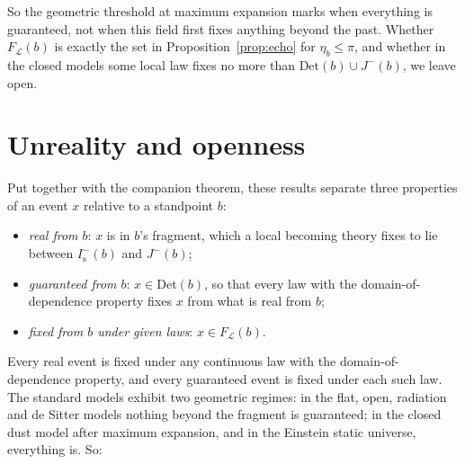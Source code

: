 \documentclass[11pt]{article}
\theoremstyle{definition}
\newcommand{\Is}{I^-_{\mathrm s}}
\newcommand{\Det}{\mathrm{Det}}
\begin{document}
So the geometric threshold at maximum expansion marks when everything is
guaranteed, not when this field first fixes anything beyond the past.
Whether $F_{\mathcal L}(b)$ is exactly the set in Proposition~\ref{prop:echo}
for $\eta_b\le\pi$, and whether in the closed models some local law fixes no
more than $\Det(b)\cup J^-(b)$, we leave open.

\section{Unreality and openness}\label{sec:phil}

Put together with the companion theorem, these results separate three
properties of an event $x$ relative to a standpoint $b$:
\begin{itemize}
\item \emph{real from $b$}: $x$ is in $b$'s fragment, which a local becoming
theory fixes to lie between $\Is(b)$ and $J^-(b)$;
\item \emph{guaranteed from $b$}: $x\in\Det(b)$, so that every law with the
domain-of-dependence property fixes $x$ from what is real from $b$;
\item \emph{fixed from $b$ under given laws}: $x\in F_{\mathcal L}(b)$.
\end{itemize}
Every real event is fixed under any continuous law with the
domain-of-dependence property, and every guaranteed event is fixed under
each such law. The standard models exhibit two geometric regimes: in the
flat, open, radiation and de Sitter models nothing beyond the fragment is
guaranteed; in the closed dust model after maximum expansion, and in the
Einstein static universe, everything is. So:
\end{document}
